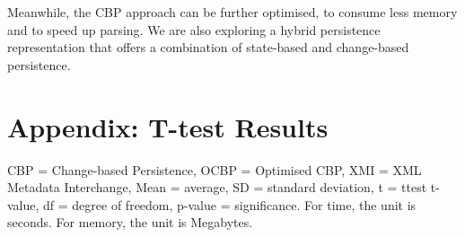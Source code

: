 \documentclass{llncs}
\begin{document}
    Meanwhile, the CBP approach can be further optimised, to consume less memory and to speed up parsing.  We are also exploring a hybrid persistence representation that offers a combination of state-based and change-based persistence. 
    
     
    
    
    \section*{Appendix: T-test Results}
    \label{app:t_test_results}
    CBP = Change-based Persistence, OCBP = Optimised CBP, XMI = XML Metadata Interchange, Mean = average, SD = standard deviation, t = ttest t-value, df = degree of freedom, p-value = significance. For time, the unit is seconds. For memory, the unit is Megabytes.
    
\end{document}
